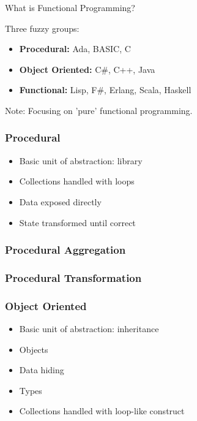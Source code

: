 \begin{frame}
  What is Functional Programming?
\end{frame}

\begin{frame}
  Three fuzzy groups:

  \begin{itemize}
    \item<1-> \textbf{Procedural:}      Ada, BASIC, C
    \item<2-> \textbf{Object Oriented:} C\#, C++, Java
    \item<3-> \textbf{Functional:}      Lisp, F\#, Erlang, Scala, Haskell
  \end{itemize}

  \pause
  \pause
  \pause

  Note: Focusing on 'pure' functional programming.
\end{frame}

\begin{frame}
  \frametitle{Procedural}

  \begin{itemize}
    \item<1-> Basic unit of abstraction: library
    \item<2-> Collections handled with loops
    \item<3-> Data exposed directly
    \item<4-> State transformed until correct
  \end{itemize}
\end{frame}

\begin{frame}[fragile]
  \frametitle{Procedural Aggregation}

  
\end{frame}

\begin{frame}[fragile]
    \frametitle{Procedural Transformation}

  
\end{frame}

\begin{frame}
  \frametitle{Object Oriented}

  \begin{itemize}
    \item<1-> Basic unit of abstraction: inheritance
    \item<2-> Objects
    \item<3-> Data hiding
    \item<4-> Types
    \item<5-> Collections handled with loop-like construct
  \end{itemize}
\end{frame}


